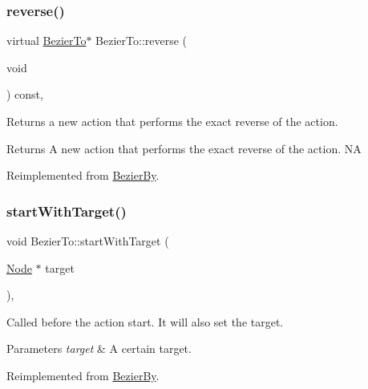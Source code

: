 \subsubsection{\texorpdfstring{reverse()}{reverse()}\hspace{0.1cm}{\footnotesize\ttfamily [2/2]}}
{\footnotesize\ttfamily virtual \hyperlink{classBezierTo}{Bezier\+To}$\ast$ Bezier\+To\+::reverse (\begin{DoxyParamCaption}\item[{void}]{ }\end{DoxyParamCaption}) const\hspace{0.3cm}{\ttfamily [override]}, {\ttfamily [virtual]}}

Returns a new action that performs the exact reverse of the action.

\begin{DoxyReturn}{Returns}
A new action that performs the exact reverse of the action.  NA 
\end{DoxyReturn}


Reimplemented from \hyperlink{classBezierBy_a6b767fe2cddd49ad43cc2724684e3810}{Bezier\+By}.

\mbox{\label{classBezierTo_ad45e47e3da2159e77c5b82fa1b6b2b1a}} 
\subsubsection{\texorpdfstring{start\+With\+Target()}{startWithTarget()}\hspace{0.1cm}{\footnotesize\ttfamily [1/2]}}
{\footnotesize\ttfamily void Bezier\+To\+::start\+With\+Target (\begin{DoxyParamCaption}\item[{\hyperlink{classNode}{Node} $\ast$}]{target }\end{DoxyParamCaption})\hspace{0.3cm}{\ttfamily [override]}, {\ttfamily [virtual]}}

Called before the action start. It will also set the target.


\begin{DoxyParams}{Parameters}
{\em target} & A certain target. \\
\hline
\end{DoxyParams}


Reimplemented from \hyperlink{classBezierBy_a3a68011f000b7f0ad58668b3ec0f7494}{Bezier\+By}.

